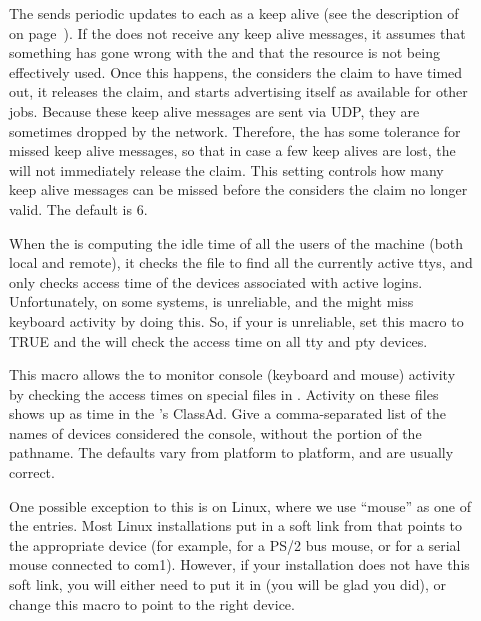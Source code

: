 \begin{description}
\item[]
  \label{param:MaxClaimAlivesMissed} The  sends periodic updates
  to each  as a keep alive (see the description of
   on page~\pageref{param:AliveInterval}).  
  If the  does not receive any keep alive messages, it assumes
  that something has gone wrong with the  and that the resource
  is not being effectively used.
  Once this happens, the  considers the claim to have timed out,
  it releases the claim, and starts advertising itself as available
  for other jobs.
  Because these keep alive messages are sent via UDP, they are
  sometimes dropped by the network.
  Therefore, the  has some tolerance for missed keep alive
  messages, so that in case a few keep alives are lost, the 
  will not immediately release the claim.
  This setting controls how many keep alive messages can be missed
  before the  considers the claim no longer valid.
  The default is 6.

\item[] \label{param:StartdHasBadUtmp}
  When the  is computing the idle time of all the
  users of the machine (both local and remote), it checks the
   file to find all the currently active ttys, and only
  checks access time of the devices associated with active logins.
  Unfortunately, on some systems,  is unreliable, and the
   might miss keyboard activity by doing this.  So, if your
   is unreliable, set this macro to TRUE and the
   will check the access time on all tty and pty devices.
  
\item[] \label{param:ConsoleDevices} This
  macro allows the  to monitor console (keyboard and mouse)
  activity by checking the access times on special files in
  .  Activity on these files shows up as 
  time in the 's ClassAd.  Give a comma-separated list of
  the names of devices considered the console, without the
   portion of the pathname.  The defaults vary from
  platform to platform, and are usually correct.  

  One possible exception to this is on Linux, where
  we use ``mouse'' as
  one of the entries.  Most Linux installations put in a
  soft link from  that points to the appropriate
  device (for example,  for a PS/2 bus mouse, or
   for a serial mouse connected to com1).  However,
  if your installation does not have this soft link, you will either
  need to put it in (you will be glad you did), or change this
  macro to point to the right device. 
  

\end{description}
